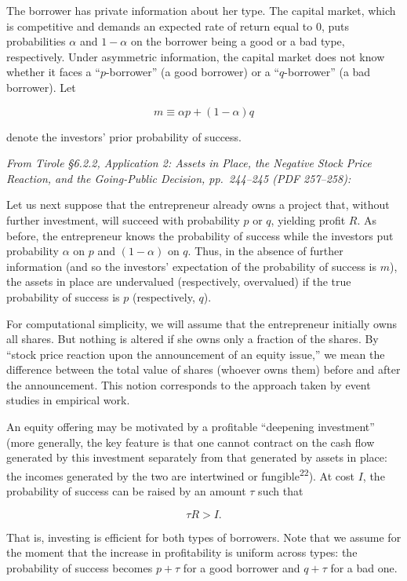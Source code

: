 \documentclass[11pt,a4paper]{article}
\begin{document}
The borrower has private information about her type. The capital market, which is competitive and
demands an expected rate of return equal to 0, puts probabilities \(\alpha\) and \(1 - \alpha\) on
the borrower being a good or a bad type, respectively. Under asymmetric information, the capital
market does not know whether it faces a ``\(p\)-borrower'' (a good borrower) or a ``\(q\)-borrower''
(a bad borrower). Let

\[m \equiv \alpha p + (1 - \alpha) q\]

denote the investors' prior probability of success.

\emph{From Tirole §6.2.2, Application 2: Assets in Place, the Negative Stock Price Reaction, and the
Going-Public Decision, pp.~244--245 (PDF 257--258):}

Let us next suppose that the entrepreneur already owns a project that, without further investment,
will succeed with probability \(p\) or \(q\), yielding profit \(R\). As before, the entrepreneur
knows the probability of success while the investors put probability \(\alpha\) on \(p\) and
\((1 - \alpha)\) on \(q\). Thus, in the absence of further information (and so the investors'
expectation of the probability of success is \(m\)), the assets in place are undervalued
(respectively, overvalued) if the true probability of success is \(p\) (respectively, \(q\)).

For computational simplicity, we will assume that the entrepreneur initially owns all shares. But
nothing is altered if she owns only a fraction of the shares. By ``stock price reaction upon the
announcement of an equity issue,'' we mean the difference between the total value of shares (whoever
owns them) before and after the announcement. This notion corresponds to the approach taken by event
studies in empirical work.

An equity offering may be motivated by a profitable ``deepening investment'' (more generally, the
key feature is that one cannot contract on the cash flow generated by this investment separately
from that generated by assets in place: the incomes generated by the two are intertwined or
fungible\textsuperscript{22}). At cost \(I\), the probability of success can be raised by an amount
\(\tau\) such that

\[\tau R > I.\]

That is, investing is efficient for both types of borrowers. Note that we assume for the moment that
the increase in profitability is uniform across types: the probability of success becomes
\(p + \tau\) for a good borrower and \(q + \tau\) for a bad one.
\end{document}
